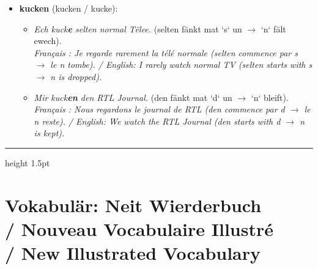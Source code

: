\begin{itemize}
    \item \textbf{kucken} (kucken / kucke):
    \begin{itemize}
        \item \textit{Ech kuck\textbf{e} selten normal Tëlee.} (selten fänkt mat `s` un $\rightarrow$ `n` fält ewech). \\
        \textit{Français : Je regarde rarement la télé normale (selten commence par s $\rightarrow$ le n tombe). / English: I rarely watch normal TV (selten starts with s $\rightarrow$ n is dropped).}
        \item \textit{Mir kuck\textbf{en} den RTL Journal.} (den fänkt mat `d` un $\rightarrow$ `n` bleift). \\
        \textit{Français : Nous regardons le journal de RTL (den commence par d $\rightarrow$ le n reste). / English: We watch the RTL Journal (den starts with d $\rightarrow$ n is kept).}
    \end{itemize}
\end{itemize}

\vspace{1.5cm}
\color{geminiBlue}\hrule height 1.5pt \vspace{0.5em}\color{black}

\section[Vokabulär: Neit Wierderbuch]{Vokabulär: Neit Wierderbuch \\/ Nouveau Vocabulaire Illustré \\/ New Illustrated Vocabulary}

